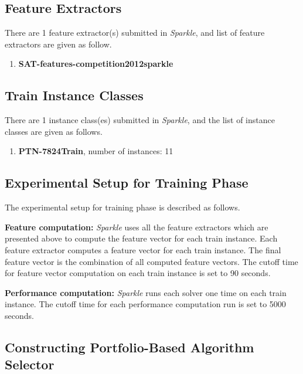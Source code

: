 \documentclass[british]{article}
\begin{document}
\subsection{Feature Extractors}
\label{sec:Feature_Extractors}
There are 1 feature extractor(s) submitted in \emph{Sparkle}, and list of feature extractors are given as follow.

\begin{enumerate}
\item \textbf{SAT-features-competition2012\textunderscore sparkle}

\end{enumerate}

\subsection{Train Instance Classes}
\label{sec:Train_Instance_Classes}
There are 1 instance class(es) submitted in \emph{Sparkle}, and the list of instance classes are given as follows.

\begin{enumerate}
\item \textbf{PTN-7824\textunderscore Train}, number of instances: 11

\end{enumerate}

\subsection{Experimental Setup for Training Phase}
\label{sec:Experimental_Setup_for_Training_Phase}

The experimental setup for training phase is described as follows.

\textbf{Feature computation:} \emph{Sparkle} uses all the feature extractors which are presented above to compute the feature vector for each train instance. Each feature extractor computes a feature vector for each train instance. The final feature vector is the combination of all computed feature vectors. The cutoff time for feature vector computation on each train instance is set to 90 seconds.

\textbf{Performance computation:} \emph{Sparkle} runs each solver one time on each train instance. The cutoff time for each performance computation run is set to 5000 seconds.

\subsection{Constructing Portfolio-Based Algorithm Selector}
\label{sec:Portfolio}
\end{document}

